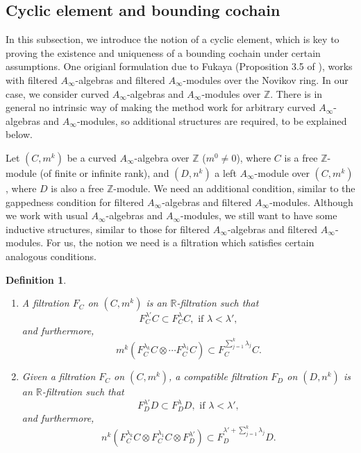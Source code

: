 \documentclass{amsart}
\newtheorem{definition}[theorem]{Definition}
\numberwithin{equation}{section}
\numberwithin{figure}{section}
\begin{document}
\subsection{Cyclic element and bounding cochain}\label{section: cyclic element and bounding cochain}
	In this subsection, we introduce the notion of a cyclic element, which is key to proving the existence and uniqueness of a bounding cochain under certain assumptions. One origianl formulation due to Fukaya (Proposition 3.5 of \cite{Fukaya2}), works with filtered $A_{\infty}$-algebras and filtered $A_{\infty}$-modules over the Novikov ring. In our case, we consider curved $A_{\infty}$-algebras and $A_{\infty}$-modules over $\mathbb{Z}$. There is in general no intrinsic way of making the method work for arbitrary curved $A_{\infty}$-algebras and $A_{\infty}$-modules, so additional structures are required, to be explained below. \par
	Let $(C, m^{k})$ be a curved $A_{\infty}$-algebra over $\mathbb{Z}$ ($m^{0} \neq 0$), where $C$ is a free $\mathbb{Z}$-module (of finite or infinite rank), and $(D, n^{k})$ a left $A_{\infty}$-module over $(C, m^{k})$, where $D$ is also a free $\mathbb{Z}$-module. We need an additional condition, similar to the gappedness condition for filtered $A_{\infty}$-algebras and filtered $A_{\infty}$-modules. Although we work with usual $A_{\infty}$-algebras and $A_{\infty}$-modules, we still want to have some inductive structures, similar to those for filtered $A_{\infty}$-algebras and filtered $A_{\infty}$-modules. For us, the notion we need is a filtration which satisfies certain analogous conditions. \par

\begin{definition}
\begin{enumerate}[label=(\roman*)]

\item A filtration $F_{C}$ on $(C, m^{k})$ is an $\mathbb{R}$-filtration such that
\begin{equation*}
F_{C}^{\lambda'}C \subset F_{C}^{\lambda}C, \text{ if } \lambda < \lambda',
\end{equation*}
and furthermore,
\begin{equation}
m^{k}(F_{C}^{\lambda_{k}}C \otimes \cdots F_{C}^{\lambda_{1}}C) \subset F_{C}^{\sum_{j = 1}^{k} \lambda_{j}}C.
\end{equation}

\item Given a filtration $F_{C}$ on $(C, m^{k})$, a compatible filtration $F_{D}$ on $(D, n^{k})$ is an $\mathbb{R}$-filtration such that
\begin{equation*}
F_{D}^{\lambda'}D \subset F_{D}^{\lambda}D, \text{ if } \lambda < \lambda',
\end{equation*}
and furthermore,
\begin{equation}
n^{k}(F_{C}^{\lambda_{k}}C \otimes F_{C}^{\lambda_{1}}C \otimes F_{D}^{\lambda'}) \subset F_{D}^{\lambda' + \sum_{j=1}^{k} \lambda_{j}}D.
\end{equation}

\end{enumerate}

\end{definition}
	
\end{document}

